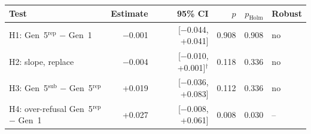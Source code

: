 \begin{tabular}{lrrrrl}
\toprule
Test & Estimate & 95\% CI & $p$ & $p_{\mathrm{Holm}}$ & Robust \\
\midrule
H1: Gen~5$^{\mathrm{rep}}$ $-$ Gen~1 & $-$0.001 & [$-$0.044, +0.041] & 0.908 & 0.908 & no \\
H2: slope, replace & $-$0.004 & [$-$0.010, +0.001]$^{\dagger}$ & 0.118 & 0.336 & no \\
H3: Gen~5$^{\mathrm{sub}}$ $-$ Gen~5$^{\mathrm{rep}}$ & +0.019 & [$-$0.036, +0.083] & 0.112 & 0.336 & no \\
H4: over-refusal Gen~5$^{\mathrm{rep}}$ $-$ Gen~1 & +0.027 & [$-$0.008, +0.061] & 0.008 & 0.030 & -- \\
\bottomrule
\end{tabular}
